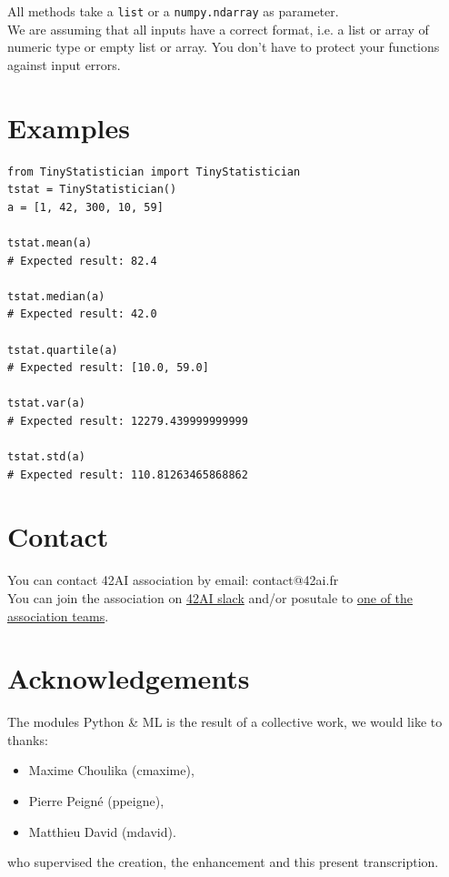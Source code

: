 \documentclass{42-en}
\begin{document}
All methods take a \texttt{list} or a \texttt{numpy.ndarray} as parameter.\\
We are assuming that all inputs have a correct format, i.e. a list or array of numeric type or empty list or array.
You don't have to protect your functions against input errors.


\section*{Examples}
\begin{verbatim}
from TinyStatistician import TinyStatistician
tstat = TinyStatistician()
a = [1, 42, 300, 10, 59]

tstat.mean(a)
# Expected result: 82.4

tstat.median(a)
# Expected result: 42.0

tstat.quartile(a)
# Expected result: [10.0, 59.0]

tstat.var(a)
# Expected result: 12279.439999999999

tstat.std(a)
# Expected result: 110.81263465868862  
\end{verbatim}




\newpage

\section*{Contact}
You can contact 42AI association by email: contact@42ai.fr\\
You can join the association on \href{https://join.slack.com/t/42-ai/shared_invite/zt-ebccw5r7-YPkDM6xOiYRPjqJXkrKgcA}{42AI slack}
and/or posutale to \href{https://forms.gle/VAFuREWaLmaqZw2D8}{one of the association teams}.

\section*{Acknowledgements}
The modules Python \& ML is the result of a collective work, we would like to thanks:
\begin{itemize}
  \item Maxime Choulika (cmaxime),
  \item Pierre Peigné (ppeigne),
  \item Matthieu David (mdavid).
\end{itemize}
who supervised the creation, the enhancement and this present transcription.
\end{document}
